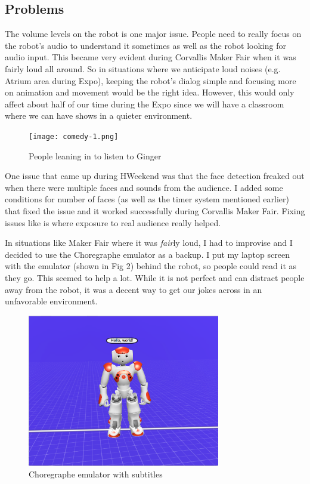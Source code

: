 \documentclass[onecolumn, draftclsnofoot,10pt, compsoc]{IEEEtran}
\begin{document}
\subsection{Problems}
The volume levels on the robot is one major issue. People need to really focus on the robot's audio to understand it sometimes as well as the robot looking for audio input. This became very evident during Corvallis Maker Fair when it was fairly loud all around. So in situations where we anticipate loud noises (e.g. Atrium area during Expo), keeping the robot's dialog simple and focusing more on animation and movement would be the right idea. However, this would only affect about half of our time during the Expo since we will have a classroom where we can have shows in a quieter environment.

\begin{figure}[H]
  \centering
  \texttt{[image: comedy-1.png]}
  \caption{People leaning in to listen to Ginger}
	\label{fig:comedy-1}
\end{figure}

One issue that came up during HWeekend was that the face detection freaked out when there were multiple faces and sounds from the audience. I added some conditions for number of faces (as well as the timer system mentioned earlier) that fixed the issue and it worked successfully during Corvallis Maker Fair. Fixing issues like is where exposure to real audience really helped.

In situations like Maker Fair where it was \textit{fair}ly loud, I had to improvise and I decided to use the Choregraphe emulator as a backup. I put my laptop screen with the emulator (shown in Fig 2) behind the robot, so people could read it as they go. This seemed to help a lot. While it is not perfect and can distract people away from the robot, it was a decent way to get our jokes across in an unfavorable environment.

\begin{figure}[H]
  \centering
  \includegraphics[width=0.75\textwidth,height=0.75\textheight,keepaspectratio]{comedy-2.png}
  \caption{Choregraphe emulator with subtitles}
	\label{fig:comedy-2}
\end{figure}
\end{document}
